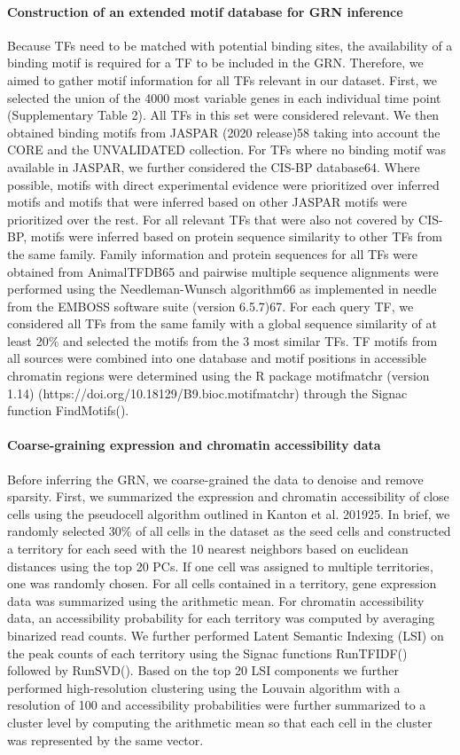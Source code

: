 \paragraph{Construction of an extended motif database for GRN inference}
Because TFs need to be matched with potential binding sites, the availability of a binding motif is required for a TF to be included in the GRN. Therefore, we aimed to gather motif information for all TFs relevant in our dataset. First, we selected the union of the 4000 most variable genes in each individual time point (Supplementary Table 2). All TFs in this set were considered relevant. We then obtained binding motifs from JASPAR (2020 release)58 taking into account the CORE and the UNVALIDATED collection. For TFs where no binding motif was available in JASPAR, we further considered the CIS-BP database64. Where possible, motifs with direct experimental evidence were prioritized over inferred motifs and motifs that were inferred based on other JASPAR motifs were prioritized over the rest. For all relevant TFs that were also not covered by CIS-BP, motifs were inferred based on protein sequence similarity to other TFs from the same family. Family information and protein sequences for all TFs were obtained from AnimalTFDB65 and pairwise multiple sequence alignments were performed using the Needleman-Wunsch algorithm66 as implemented in needle from the EMBOSS software suite (version 6.5.7)67. For each query TF, we considered all TFs from the same family with a global sequence similarity of at least 20\% and selected the motifs from the 3 most similar TFs. TF motifs from all sources were combined into one database and motif positions in accessible chromatin regions were determined using the R package motifmatchr (version 1.14) (https://doi.org/10.18129/B9.bioc.motifmatchr) through the Signac function FindMotifs().
 
\paragraph{Coarse-graining expression and chromatin accessibility data}
Before inferring the GRN, we coarse-grained the data to denoise and remove sparsity. First, we summarized the expression and chromatin accessibility of close cells using the pseudocell algorithm outlined in Kanton et al. 201925. In brief, we randomly selected 30\% of all cells in the dataset as the seed cells and constructed a territory for each seed with the 10 nearest neighbors based on euclidean distances using the top 20 PCs. If one cell was assigned to multiple territories, one was randomly chosen. For all cells contained in a territory, gene expression data was summarized using the arithmetic mean. For chromatin accessibility data, an accessibility probability for each territory was computed by averaging binarized read counts. We further performed Latent Semantic Indexing (LSI) on the peak counts of each territory using the Signac functions RunTFIDF() followed by RunSVD(). Based on the top 20 LSI components we further performed high-resolution clustering using the Louvain algorithm with a resolution of 100 and accessibility probabilities were further summarized to a cluster level by computing the arithmetic mean so that each cell in the cluster was represented by the same vector.
 
